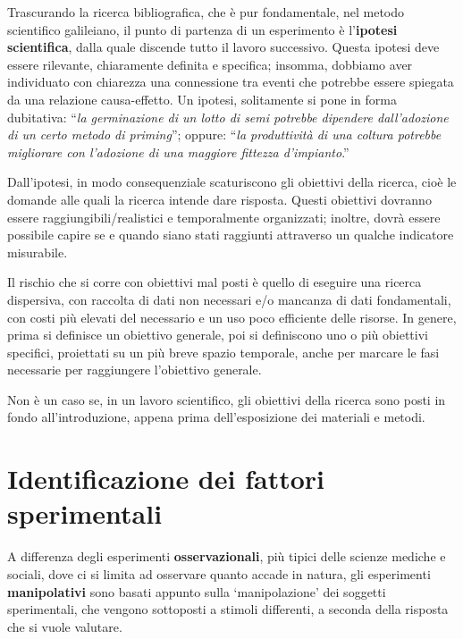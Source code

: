 \documentclass[a4paper,12pt,oneside]{book}
\begin{document}
Trascurando la ricerca bibliografica, che è pur fondamentale, nel metodo scientifico galileiano, il punto di partenza di un esperimento è l'\textbf{ipotesi scientifica}, dalla quale discende tutto il lavoro successivo. Questa ipotesi deve essere rilevante, chiaramente definita e specifica; insomma, dobbiamo aver individuato con chiarezza una connessione tra eventi che potrebbe essere spiegata da una relazione causa-effetto. Un ipotesi, solitamente si pone in forma dubitativa: ``\emph{la germinazione di un lotto di semi potrebbe dipendere dall'adozione di un certo metodo di priming}''; oppure: ``\emph{la produttività di una coltura potrebbe migliorare con l'adozione di una maggiore fittezza d'impianto}.''

Dall'ipotesi, in modo consequenziale scaturiscono gli obiettivi della ricerca, cioè le domande alle quali la ricerca intende dare risposta. Questi obiettivi dovranno essere raggiungibili/realistici e temporalmente organizzati; inoltre, dovrà essere possibile capire se e quando siano stati raggiunti attraverso un qualche indicatore misurabile.

Il rischio che si corre con obiettivi mal posti è quello di eseguire una ricerca dispersiva, con raccolta di dati non necessari e/o mancanza di dati fondamentali, con costi più elevati del necessario e un uso poco efficiente delle risorse. In genere, prima si definisce un obiettivo generale, poi si definiscono uno o più obiettivi specifici, proiettati su un più breve spazio temporale, anche per marcare le fasi necessarie per raggiungere l'obiettivo generale.

Non è un caso se, in un lavoro scientifico, gli obiettivi della ricerca sono posti in fondo all'introduzione, appena prima dell'esposizione dei materiali e metodi.

\hypertarget{identificazione-dei-fattori-sperimentali}{%
\section{Identificazione dei fattori sperimentali}\label{identificazione-dei-fattori-sperimentali}}

A differenza degli esperimenti \textbf{osservazionali}, più tipici delle scienze mediche e sociali, dove ci si limita ad osservare quanto accade in natura, gli esperimenti \textbf{manipolativi} sono basati appunto sulla `manipolazione' dei soggetti sperimentali, che vengono sottoposti a stimoli differenti, a seconda della risposta che si vuole valutare.
\end{document}
